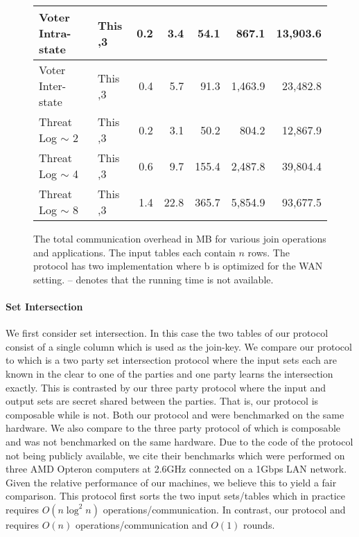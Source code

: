 \begin{figure*}[t!]
\begin{tabular}{|l |l|| r | r |r |r|r|}
		Voter Intra-state                 & This                           \hfill ,3        & 0.2   & 3.4      & 54.1     & 867.1    & 13,903.6 \\ \hline
		Voter Inter-state                 & This                           \hfill ,3        & 0.4   & 5.7      & 91.3     & 1,463.9  & 23,482.8 \\ \hline\hline
		Threat Log $\sim$ 2               & This                           \hfill ,3        & 0.2   & 3.1      & 50.2     & 804.2    & 12,867.9 \\ \hline
		Threat Log $\sim$ 4               & This                           \hfill ,3        & 0.6   & 9.7      & 155.4    & 2,487.8  & 39,804.4 \\ \hline
		Threat Log $\sim$ 8               & This                           \hfill ,3        & 1.4   & 22.8     & 365.7    & 5,854.9  & 93,677.5 \\ \hline
	\end{tabular}
	\caption{\label{fig:comm}	The total communication overhead in MB for various join operations and applications. The input tables each contain $n$ rows. The  \cite{PSWW18} protocol has two implementation where  \cite{PSWW18}b is optimized for the WAN setting. -- denotes that the running time is not available. }
	\vspace{-0.2cm}
\end{figure*}




\paragraph{Set Intersection} We first consider set intersection. In this case the two tables of our protocol consist of a single column which is used as the join-key. We compare our protocol to \cite{CCS:KKRT16} which is a two party set intersection protocol where the input sets each are known in the clear to one of the parties and one party learns the intersection exactly. This is contrasted by our three party protocol where the input and output sets are secret shared between the parties. That is, our protocol is composable while \cite{CCS:KKRT16} is not. Both our protocol and \cite{CCS:KKRT16} were benchmarked on the same hardware. We also compare to the three party protocol of \cite{ASIACCS:BlaAgu12} which is composable and was not benchmarked on the same hardware. Due to the code of the \cite{ASIACCS:BlaAgu12} protocol not being publicly available, we cite their benchmarks which were performed on three AMD Opteron computers at 2.6GHz connected on a 1Gbps LAN network. Given the relative performance of our machines, we believe this to yield a fair comparison. This protocol first sorts the two input sets/tables which in practice requires $O(n\log^2 n)$ operations/communication\cite{ASIACCS:BlaAgu12}. In contrast, our protocol and \cite{CCS:KKRT16} requires $O(n)$ operations/communication and $O(1)$ rounds. 

